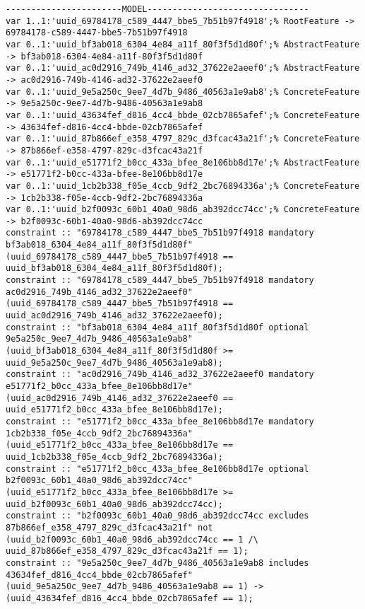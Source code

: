 \documentclass[11pt]{article}
\begin{document}
\begin{verbatim}
-----------------------MODEL--------------------------------
var 1..1:'uuid_69784178_c589_4447_bbe5_7b51b97f4918';% RootFeature -> 69784178-c589-4447-bbe5-7b51b97f4918
var 0..1:'uuid_bf3ab018_6304_4e84_a11f_80f3f5d1d80f';% AbstractFeature -> bf3ab018-6304-4e84-a11f-80f3f5d1d80f
var 0..1:'uuid_ac0d2916_749b_4146_ad32_37622e2aeef0';% AbstractFeature -> ac0d2916-749b-4146-ad32-37622e2aeef0
var 0..1:'uuid_9e5a250c_9ee7_4d7b_9486_40563a1e9ab8';% ConcreteFeature -> 9e5a250c-9ee7-4d7b-9486-40563a1e9ab8
var 0..1:'uuid_43634fef_d816_4cc4_bbde_02cb7865afef';% ConcreteFeature -> 43634fef-d816-4cc4-bbde-02cb7865afef
var 0..1:'uuid_87b866ef_e358_4797_829c_d3fcac43a21f';% ConcreteFeature -> 87b866ef-e358-4797-829c-d3fcac43a21f
var 0..1:'uuid_e51771f2_b0cc_433a_bfee_8e106bb8d17e';% AbstractFeature -> e51771f2-b0cc-433a-bfee-8e106bb8d17e
var 0..1:'uuid_1cb2b338_f05e_4ccb_9df2_2bc76894336a';% ConcreteFeature -> 1cb2b338-f05e-4ccb-9df2-2bc76894336a
var 0..1:'uuid_b2f0093c_60b1_40a0_98d6_ab392dcc74cc';% ConcreteFeature -> b2f0093c-60b1-40a0-98d6-ab392dcc74cc
constraint :: "69784178_c589_4447_bbe5_7b51b97f4918 mandatory bf3ab018_6304_4e84_a11f_80f3f5d1d80f" (uuid_69784178_c589_4447_bbe5_7b51b97f4918 == uuid_bf3ab018_6304_4e84_a11f_80f3f5d1d80f);
constraint :: "69784178_c589_4447_bbe5_7b51b97f4918 mandatory ac0d2916_749b_4146_ad32_37622e2aeef0" (uuid_69784178_c589_4447_bbe5_7b51b97f4918 == uuid_ac0d2916_749b_4146_ad32_37622e2aeef0);
constraint :: "bf3ab018_6304_4e84_a11f_80f3f5d1d80f optional 9e5a250c_9ee7_4d7b_9486_40563a1e9ab8" (uuid_bf3ab018_6304_4e84_a11f_80f3f5d1d80f >= uuid_9e5a250c_9ee7_4d7b_9486_40563a1e9ab8);
constraint :: "ac0d2916_749b_4146_ad32_37622e2aeef0 mandatory e51771f2_b0cc_433a_bfee_8e106bb8d17e" (uuid_ac0d2916_749b_4146_ad32_37622e2aeef0 == uuid_e51771f2_b0cc_433a_bfee_8e106bb8d17e);
constraint :: "e51771f2_b0cc_433a_bfee_8e106bb8d17e mandatory 1cb2b338_f05e_4ccb_9df2_2bc76894336a" (uuid_e51771f2_b0cc_433a_bfee_8e106bb8d17e == uuid_1cb2b338_f05e_4ccb_9df2_2bc76894336a);
constraint :: "e51771f2_b0cc_433a_bfee_8e106bb8d17e optional b2f0093c_60b1_40a0_98d6_ab392dcc74cc" (uuid_e51771f2_b0cc_433a_bfee_8e106bb8d17e >= uuid_b2f0093c_60b1_40a0_98d6_ab392dcc74cc);
constraint :: "b2f0093c_60b1_40a0_98d6_ab392dcc74cc excludes 87b866ef_e358_4797_829c_d3fcac43a21f" not (uuid_b2f0093c_60b1_40a0_98d6_ab392dcc74cc == 1 /\ uuid_87b866ef_e358_4797_829c_d3fcac43a21f == 1);
constraint :: "9e5a250c_9ee7_4d7b_9486_40563a1e9ab8 includes 43634fef_d816_4cc4_bbde_02cb7865afef" (uuid_9e5a250c_9ee7_4d7b_9486_40563a1e9ab8 == 1) -> (uuid_43634fef_d816_4cc4_bbde_02cb7865afef == 1);

\end{verbatim}
\end{document}

